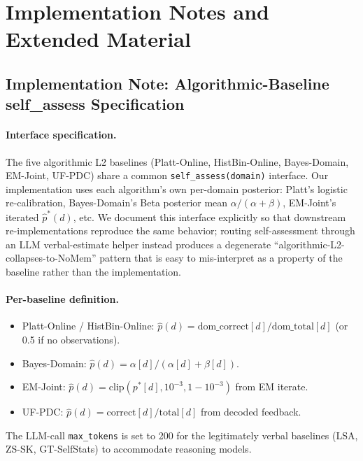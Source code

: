 \documentclass[11pt]{article}
\begin{document}
\section{Implementation Notes and Extended Material}
\label{app:group_g}

\subsection{Implementation Note: Algorithmic-Baseline self\_assess Specification}
\label{sec:bugfix}

\paragraph{Interface specification.} The five algorithmic L2 baselines (Platt-Online, HistBin-Online, Bayes-Domain, EM-Joint, UF-PDC) share a common \texttt{self\_assess(domain)} interface. Our implementation uses each algorithm's own per-domain posterior: Platt's logistic re-calibration, Bayes-Domain's Beta posterior mean $\alpha/(\alpha+\beta)$, EM-Joint's iterated $\hat p^*(d)$, etc. We document this interface explicitly so that downstream re-implementations reproduce the same behavior; routing self-assessment through an LLM verbal-estimate helper instead produces a degenerate ``algorithmic-L2-collapses-to-NoMem'' pattern that is easy to mis-interpret as a property of the baseline rather than the implementation.

\paragraph{Per-baseline definition.}
\begin{itemize}[nosep,leftmargin=1.4em]
  \item Platt-Online / HistBin-Online: $\hat p(d) = \mathrm{dom\_correct}[d] / \mathrm{dom\_total}[d]$ (or 0.5 if no observations).
  \item Bayes-Domain: $\hat p(d) = \alpha[d]/(\alpha[d]+\beta[d])$.
  \item EM-Joint: $\hat p(d) = \mathrm{clip}(p^*[d], 10^{-3}, 1{-}10^{-3})$ from EM iterate.
  \item UF-PDC: $\hat p(d) = \mathrm{correct}[d]/\mathrm{total}[d]$ from decoded feedback.
\end{itemize}
The LLM-call \texttt{max\_tokens} is set to 200 for the legitimately verbal baselines (LSA, ZS-SK, GT-SelfStats) to accommodate reasoning models.
\end{document}
